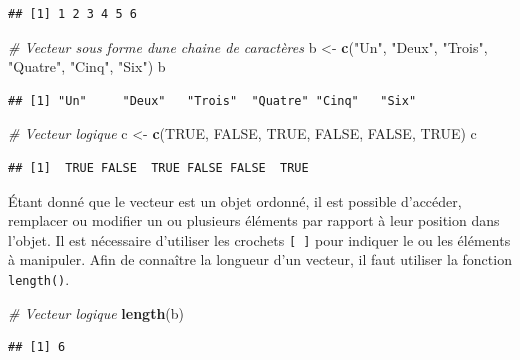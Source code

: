 \documentclass[
]{book}
\newenvironment{Shaded}{\begin{snugshade}}{\end{snugshade}}
\newcommand{\CommentTok}[1]{\textcolor[rgb]{0.56,0.35,0.01}{\textit{#1}}}
\newcommand{\ConstantTok}[1]{\textcolor[rgb]{0.56,0.35,0.01}{#1}}
\newcommand{\FunctionTok}[1]{\textcolor[rgb]{0.13,0.29,0.53}{\textbf{#1}}}
\newcommand{\NormalTok}[1]{#1}
\newcommand{\OtherTok}[1]{\textcolor[rgb]{0.56,0.35,0.01}{#1}}
\newcommand{\StringTok}[1]{\textcolor[rgb]{0.31,0.60,0.02}{#1}}
\begin{document}
\begin{verbatim}
## [1] 1 2 3 4 5 6
\end{verbatim}

\begin{Shaded}
\begin{Highlighting}[]
\CommentTok{\# Vecteur sous forme d\textquotesingle{}une chaine de caractères}
\NormalTok{b }\OtherTok{\textless{}{-}} \FunctionTok{c}\NormalTok{(}\StringTok{"Un"}\NormalTok{, }\StringTok{"Deux"}\NormalTok{, }\StringTok{"Trois"}\NormalTok{, }\StringTok{"Quatre"}\NormalTok{, }\StringTok{"Cinq"}\NormalTok{, }\StringTok{"Six"}\NormalTok{)}
\NormalTok{b}
\end{Highlighting}
\end{Shaded}

\begin{verbatim}
## [1] "Un"     "Deux"   "Trois"  "Quatre" "Cinq"   "Six"
\end{verbatim}

\begin{Shaded}
\begin{Highlighting}[]
\CommentTok{\# Vecteur logique}
\NormalTok{c }\OtherTok{\textless{}{-}} \FunctionTok{c}\NormalTok{(}\ConstantTok{TRUE}\NormalTok{, }\ConstantTok{FALSE}\NormalTok{, }\ConstantTok{TRUE}\NormalTok{, }\ConstantTok{FALSE}\NormalTok{, }\ConstantTok{FALSE}\NormalTok{, }\ConstantTok{TRUE}\NormalTok{)}
\NormalTok{c}
\end{Highlighting}
\end{Shaded}

\begin{verbatim}
## [1]  TRUE FALSE  TRUE FALSE FALSE  TRUE
\end{verbatim}

Étant donné que le vecteur est un objet ordonné, il est possible d'accéder, remplacer ou modifier un ou plusieurs éléments par rapport à leur position dans l'objet. Il est nécessaire d'utiliser les crochets \texttt{{[}\ {]}} pour indiquer le ou les éléments à manipuler. Afin de connaître la longueur d'un vecteur, il faut utiliser la fonction \texttt{length()}.

\begin{Shaded}
\begin{Highlighting}[]
\CommentTok{\# Vecteur logique}
\FunctionTok{length}\NormalTok{(b)}
\end{Highlighting}
\end{Shaded}

\begin{verbatim}
## [1] 6
\end{verbatim}
\end{document}
